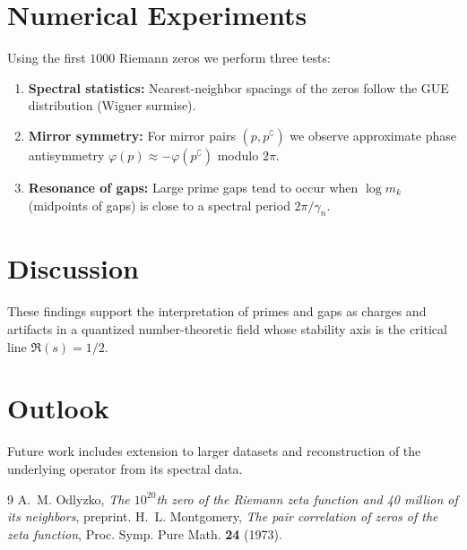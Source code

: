 \documentclass[11pt]{article}
\begin{document}
\section{Numerical Experiments}
Using the first $1000$ Riemann zeros we perform three tests:
\begin{enumerate}
\item \textbf{Spectral statistics:} Nearest-neighbor spacings of the
zeros follow the GUE distribution (Wigner surmise).
\item \textbf{Mirror symmetry:} For mirror pairs $(p,p^\complement)$ we
observe approximate phase antisymmetry
$\varphi(p)\approx-\varphi(p^\complement)$ modulo $2\pi$.
\item \textbf{Resonance of gaps:} Large prime gaps tend to occur when
$\log m_k$ (midpoints of gaps) is close to a spectral period
$2\pi/\gamma_n$.
\end{enumerate}

\section{Discussion}
These findings support the interpretation of primes and gaps as charges
and artifacts in a quantized number-theoretic field whose stability axis
is the critical line $\Re(s)=1/2$.

\section{Outlook}
Future work includes extension to larger datasets and reconstruction of
the underlying operator from its spectral data.


\begin{thebibliography}{9}
A.~M. Odlyzko, \emph{The $10^{20}$th zero of the Riemann zeta function and
40 million of its neighbors}, preprint.
H.~L. Montgomery, \emph{The pair correlation of zeros of the zeta
function}, Proc. Symp. Pure Math. \textbf{24} (1973).
\end{thebibliography}
\end{document}
